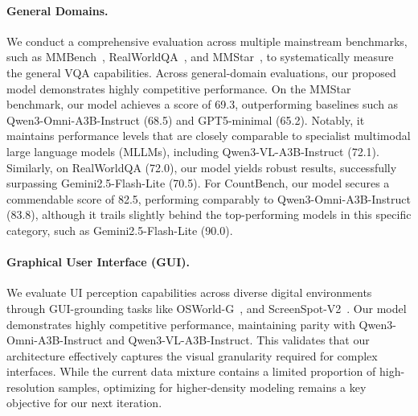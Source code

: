 \paragraph{General Domains.} %
We conduct a comprehensive evaluation across multiple mainstream benchmarks, such as MMBench~\cite{DBLP:conf/eccv/LiuDZLZZYWHLCL24}, RealWorldQA~\cite{realworldqa2024}, and MMStar~\cite{DBLP:conf/nips/ChenLDZZCDWQLZ24}, to systematically measure the general VQA capabilities. Across general-domain evaluations, our proposed model demonstrates highly competitive performance. On the MMStar benchmark, our model achieves a score of 69.3, outperforming baselines such as Qwen3-Omni-A3B-Instruct (68.5) and GPT5-minimal (65.2). Notably, it maintains performance levels that are closely comparable to specialist multimodal large language models (MLLMs), including Qwen3-VL-A3B-Instruct (72.1). Similarly, on RealWorldQA (72.0), our model yields robust results, successfully surpassing Gemini2.5-Flash-Lite (70.5). For CountBench, our model secures a commendable score of 82.5, performing comparably to Qwen3-Omni-A3B-Instruct (83.8), although it trails slightly behind the top-performing models in this specific category, such as Gemini2.5-Flash-Lite (90.0).



\paragraph{Graphical User Interface (GUI).}
We evaluate UI perception capabilities across diverse digital environments through GUI-grounding tasks like OSWorld-G~\cite{xie2025scalingcomputerusegroundinguser}, and ScreenSpot-V2~\cite{wu2024atlas}. Our model demonstrates highly competitive performance, maintaining parity with Qwen3-Omni-A3B-Instruct and Qwen3-VL-A3B-Instruct. This validates that our architecture effectively captures the visual granularity required for complex interfaces. While the current data mixture contains a limited proportion of high-resolution samples, optimizing for higher-density modeling remains a key objective for our next iteration.

